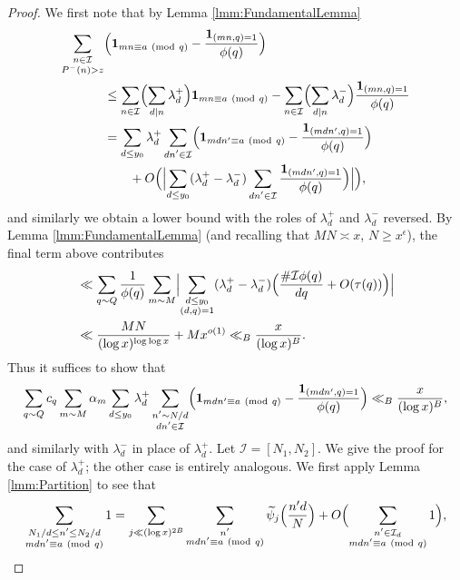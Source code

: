 \documentclass[10pt]{amsart}
\theoremstyle{plain}
\numberwithin{equation}{section}
\newcommand{\Mod}[1]{\ (\mathrm{mod}\ #1)}
\begin{document}
\begin{proof}
We first note that by Lemma \ref{lmm:FundamentalLemma}
\begin{align*}
\sum_{\substack{n\in\mathcal{I}\\ P^-(n)>z}}&\Bigl(\mathbf{1}_{m n\equiv a\Mod{q}}-\frac{\mathbf{1}_{(m n,q)=1}}{\phi(q)}\Bigr)\\
&\le \sum_{\substack{n\in\mathcal{I}}}\Bigl(\sum_{d|n}\lambda^+_d\Bigr) \mathbf{1}_{m n\equiv a\Mod{q}}-\sum_{\substack{n\in\mathcal{I}}}\Bigl(\sum_{d|n}\lambda^-_d\Bigr) \frac{\mathbf{1}_{(m n,q)=1}}{\phi(q)}\\
&= \sum_{d\le y_0}\lambda^+_d \sum_{\substack{d n'\in\mathcal{I}}}\Bigl(\mathbf{1}_{m d n'\equiv a\Mod{q}}-\frac{\mathbf{1}_{(m d n',q)=1}}{\phi(q)}\Bigr)\\
&\qquad +O\Bigl(\Bigl| \sum_{d\le y_0}(\lambda^+_d-\lambda^-_d) \sum_{\substack{d n'\in\mathcal{I}}}\frac{\mathbf{1}_{(m d n',q)=1}}{\phi(q)}\Bigr)\Bigr|\Bigr),
\end{align*}
and similarly we obtain a lower bound with the roles of $\lambda^+_d$ and $\lambda^-_d$ reversed. By Lemma \ref{lmm:FundamentalLemma} (and recalling that $MN\asymp x$, $N\ge x^\epsilon$), the final term above contributes
\begin{align*}
&\ll \sum_{q\sim Q}\frac{1}{\phi(q)}\sum_{m\sim M}\Bigl|\sum_{\substack{d\le y_0\\ (d,q)=1}} (\lambda^+_d-\lambda_d^-)\Bigl(\frac{\#\mathcal{I}\phi(q)}{d q}+O(\tau(q))\Bigr)\Bigr|\\
&\ll \frac{MN}{(\log{x})^{\log\log{x}}}+M x^{o(1)}\ll_B \frac{x}{(\log{x})^B}.
\end{align*}
Thus it suffices to show that
\[
\sum_{q\sim Q}c_q \sum_{m\sim M}\alpha_m\sum_{d\le y_0}\lambda^+_d \sum_{\substack{n'\sim N/d\\ dn'\in\mathcal{I}}}\Bigl(\mathbf{1}_{m d n'\equiv a\Mod{q}}-\frac{\mathbf{1}_{(m d n',q)=1}}{\phi(q)}\Bigr)\ll_B \frac{x}{(\log{x})^B},
\]
and similarly with $\lambda_d^-$ in place of $\lambda_d^+$. Let $\mathcal{I}=[N_1,N_2]$. We give the proof for the case of $\lambda_d^+$; the other case is entirely analogous. We first apply Lemma \ref{lmm:Partition} to see that
\[
\sum_{\substack{N_1/d\le n'\le N_2/d\\m d n'\equiv a\Mod{q}}}1=\sum_{j\ll (\log{x})^{2B} }\sum_{\substack{n'\\ m d n'\equiv a\Mod{q}}}\widetilde{\psi}_j\Bigl(\frac{n' d}{N}\Bigr)+O\Bigl(\sum_{\substack{n'\in \mathcal{I}_d\\ m d n'\equiv a\Mod{q}}}1\Bigr),
\]
\end{proof}
\end{document}
